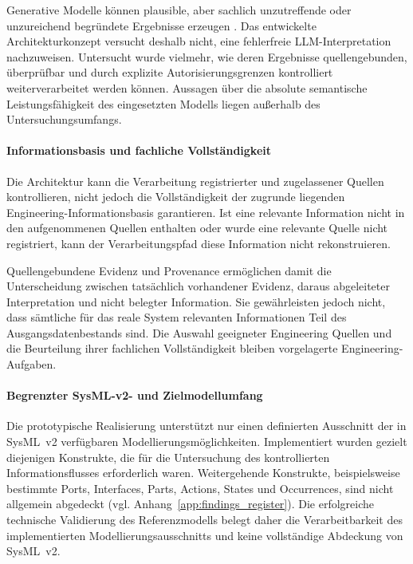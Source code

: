 Generative Modelle können plausible, aber sachlich unzutreffende oder
unzureichend begründete Ergebnisse erzeugen
\cite{Topcu2025}. Das entwickelte Architekturkonzept
versucht deshalb nicht, eine fehlerfreie LLM-Interpretation nachzuweisen.
Untersucht wurde vielmehr, wie deren Ergebnisse quellengebunden,
überprüfbar und durch explizite Autorisierungsgrenzen kontrolliert
weiterverarbeitet werden können. Aussagen über die absolute semantische
Leistungsfähigkeit des eingesetzten Modells liegen außerhalb des
Untersuchungsumfangs.

\paragraph{Informationsbasis und fachliche Vollständigkeit}

Die Architektur kann die Verarbeitung registrierter und zugelassener Quellen
kontrollieren, nicht jedoch die Vollständigkeit der zugrunde liegenden
Engineering-Informationsbasis garantieren. Ist eine relevante Information
nicht in den aufgenommenen Quellen enthalten oder wurde eine relevante
Quelle nicht registriert, kann der Verarbeitungspfad diese Information nicht
rekonstruieren.

Quellengebundene Evidenz und Provenance ermöglichen damit die
Unterscheidung zwischen tatsächlich vorhandener Evidenz, daraus
abgeleiteter Interpretation und nicht belegter Information. Sie gewährleisten
jedoch nicht, dass sämtliche für das reale System relevanten Informationen
Teil des Ausgangsdatenbestands sind. Die Auswahl geeigneter Engineering
Quellen und die Beurteilung ihrer fachlichen Vollständigkeit bleiben
vorgelagerte Engineering-Aufgaben.

\paragraph{Begrenzter SysML-v2- und Zielmodellumfang}

Die prototypische Realisierung unterstützt nur einen definierten Ausschnitt
der in SysML~v2 verfügbaren Modellierungsmöglichkeiten. Implementiert wurden
gezielt diejenigen Konstrukte, die für die Untersuchung des kontrollierten
Informationsflusses erforderlich waren. Weitergehende Konstrukte,
beispielsweise bestimmte Ports, Interfaces, Parts, Actions, States und
Occurrences, sind nicht allgemein abgedeckt
(vgl. Anhang~\ref{app:findings_register}). Die erfolgreiche technische
Validierung des Referenzmodells belegt daher die Verarbeitbarkeit des
implementierten Modellierungsausschnitts und keine vollständige Abdeckung von
SysML~v2.

